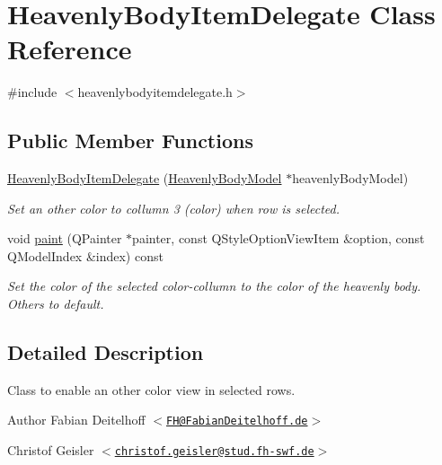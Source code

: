 \hypertarget{classHeavenlyBodyItemDelegate}{
\section{\-Heavenly\-Body\-Item\-Delegate \-Class \-Reference}
\label{dc/dc9/classHeavenlyBodyItemDelegate}
}


{\ttfamily \#include $<$heavenlybodyitemdelegate.\-h$>$}

\subsection*{\-Public \-Member \-Functions}
\begin{DoxyCompactItemize}
\item 
\hyperlink{classHeavenlyBodyItemDelegate_ab16dfebe2c70f5b6468a65571546b9a9}{\-Heavenly\-Body\-Item\-Delegate} (\hyperlink{classHeavenlyBodyModel}{\-Heavenly\-Body\-Model} $\ast$heavenly\-Body\-Model)
\begin{DoxyCompactList}\small\item\em \-Set an other color to collumn 3 (color) when row is selected. \end{DoxyCompactList}\item 
void \hyperlink{classHeavenlyBodyItemDelegate_a79a286b97de08c04af5b65f5139db7d4}{paint} (\-Q\-Painter $\ast$painter, const \-Q\-Style\-Option\-View\-Item \&option, const \-Q\-Model\-Index \&index) const 
\begin{DoxyCompactList}\small\item\em \-Set the color of the selected color-\/collumn to the color of the heavenly body. \-Others to default. \end{DoxyCompactList}\end{DoxyCompactItemize}


\subsection{\-Detailed \-Description}
\-Class to enable an other color view in selected rows.

\begin{DoxyAuthor}{\-Author}
\-Fabian \-Deitelhoff $<$\href{mailto:FH@FabianDeitelhoff.de}{\tt \-F\-H@\-Fabian\-Deitelhoff.\-de}$>$ 

\-Christof \-Geisler $<$\href{mailto:christof.geisler@stud.fh-swf.de}{\tt christof.\-geisler@stud.\-fh-\/swf.\-de}$>$ 
\end{DoxyAuthor}


